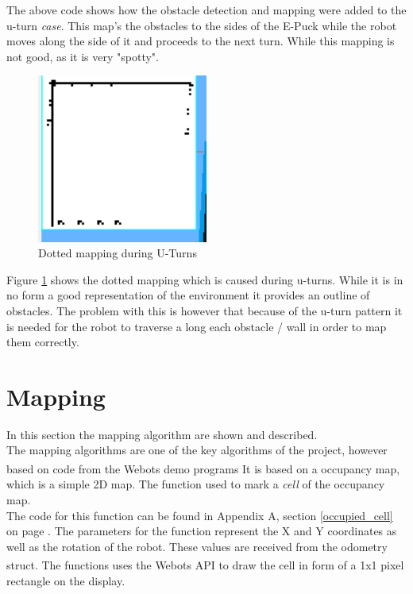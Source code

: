 The above code shows how the obstacle detection and mapping were added to the u-turn \textit{case}. 
This map's the obstacles to the sides of the E-Puck while the robot moves along the side of it and proceeds to the next turn. While this mapping is not good, as it is very "spotty".

\begin{figure}[h]
\centering
\includegraphics[width = 0.5\textwidth]{../../figures/map_results/dotted_uturn_mapping.png} 
\caption{Dotted mapping during U-Turns}
\label{dotted_uturn}
\end{figure}

Figure \ref{dotted_uturn} shows the dotted mapping which is caused during u-turns. While it is in no form a good representation of the environment it provides an outline of obstacles. The problem with this is however that because of the u-turn pattern it is needed for the robot to traverse a long each obstacle / wall in order to map them correctly. 

\section{Mapping}
In this section the mapping algorithm are shown and described. \\
The mapping algorithms are one of the key algorithms of the project, however based on code from the Webots\textsuperscript{\texttrademark} demo programs It is based on a occupancy map, which is a simple 2D map. The function used to mark a \textit{cell} of the occupancy map.\\
The code for this function can be found in Appendix A, section \ref{occupied_cell} on page \pageref{occupied_cell}.
The parameters for the function represent the X and Y coordinates as well as the rotation of the robot. These values are received from the odometry struct. 
The functions uses the Webots\textsuperscript{\texttrademark}  API to draw the cell in form of a 1x1 pixel rectangle on the display. 

